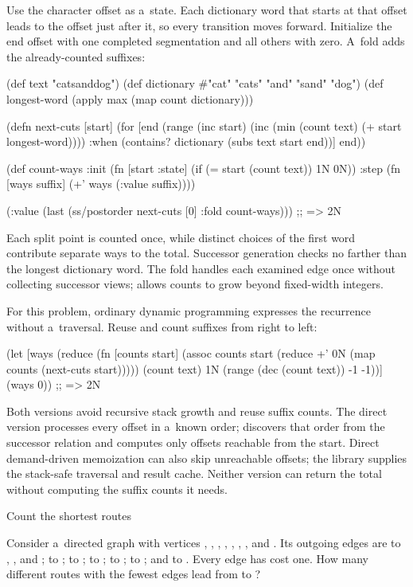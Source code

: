 {{{\smallskip
{} Use the character offset as a~state. Each
dictionary word that starts at that offset leads to the offset just after
it, so every transition moves forward. Initialize the end offset with one
completed segmentation and all others with zero. A~fold
adds the already-counted suffixes:

\begtt {}
(def text "catsanddog")
(def dictionary #{"cat" "cats" "and" "sand" "dog"})
(def longest-word (apply max (map count dictionary)))

(defn next-cuts [start]
  (for [end (range (inc start)
                   (inc (min (count text) (+ start longest-word))))
        :when (contains? dictionary (subs text start end))]
    end))

(def count-ways
  {:init (fn [{start :state}] (if (= start (count text)) 1N 0N))
   :step (fn [ways suffix] (+' ways (:value suffix)))})

(:value (last (ss/postorder next-cuts [0] {:fold count-ways})))
;; => 2N
\endtt

Each split point is counted once, while distinct choices of the first word
contribute separate ways to the total.
Successor generation checks no farther than the longest dictionary word.
The fold handles each examined edge once without collecting successor views;
 allows counts to grow beyond fixed-width integers.

\smallskip
{} For this problem, ordinary dynamic
programming expresses the recurrence without a~traversal.
Reuse  and count suffixes from right to left:

\begtt {}
(let [ways (reduce
            (fn [counts start]
              (assoc counts start
                     (reduce +' 0N (map counts (next-cuts start)))))
            {(count text) 1N}
            (range (dec (count text)) -1 -1))]
  (ways 0))
;; => 2N
\endtt

Both versions avoid recursive stack growth and reuse suffix counts.
The direct version processes every offset in a~known order;
 discovers that order from the successor relation and
computes only offsets reachable from the start. Direct demand-driven
memoization can also skip unreachable offsets; the library supplies the
stack-safe traversal and result cache.
Neither version can return the total without computing the suffix counts
it needs.

\secc Count the shortest routes

 Consider a~directed graph with vertices
, , , , , ,
, and . Its outgoing edges are  to ,
, and ;  to ;  to
;  to ;  to ;  to
; and  to . Every edge has cost one. How many
different routes with the fewest edges lead from  to ?

}}}
